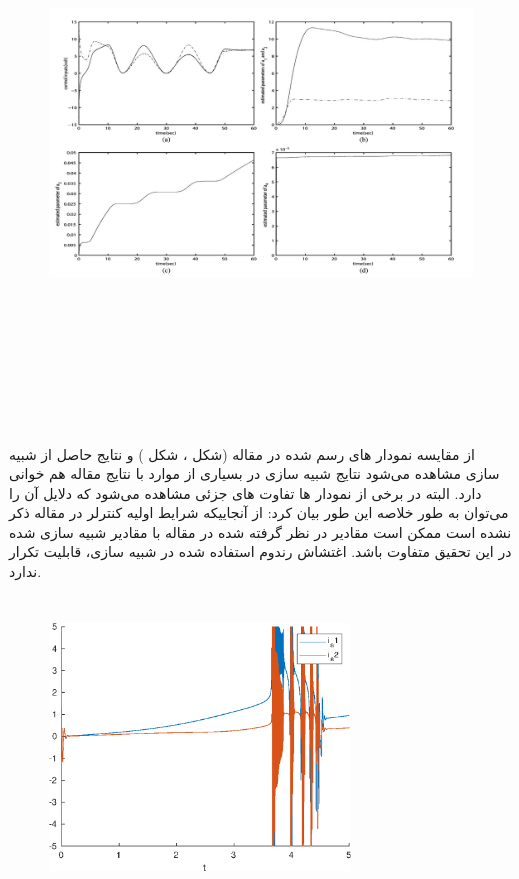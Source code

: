 \begin{figure}[h]
	\centering
	\includegraphics[height=15cm,width=15cm]{img/article_result2}
\end{figure}
از مقایسه نمودار های رسم شده در مقاله (شکل ،
 شکل ) و نتایج حاصل از شبیه سازی مشاهده می‌شود نتایج شبیه سازی در بسیاری از موارد با نتایج مقاله هم خوانی دارد. البته در برخی از نمودار ها تفاوت های جزئی مشاهده می‌شود که دلایل آن را می‌توان به طور خلاصه این طور بیان کرد:
 از آنجاییکه شرایط اولیه کنترلر در مقاله ذکر نشده است ممکن است مقادیر در نظر گرفته شده در مقاله با مقادیر شبیه سازی شده در این تحقیق متفاوت باشد.
 اغتشاش رندوم استفاده شده در شبیه سازی، قابلیت تکرار ندارد. 
\begin{figure}[h]
	\centering
	\includegraphics[height=8cm,width=8cm]{img/fig-unstable}
\end{figure}